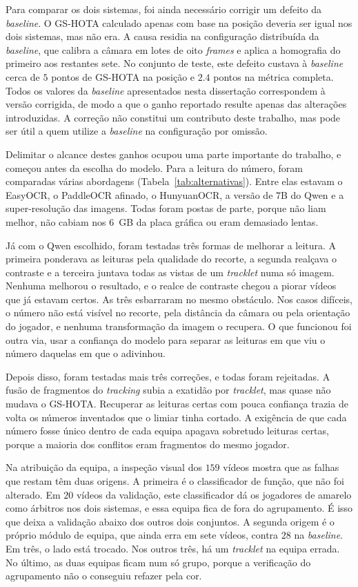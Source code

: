 Para comparar os dois sistemas, foi ainda necessário corrigir um defeito da \emph{baseline}. O GS-HOTA calculado apenas com base na posição deveria ser igual nos dois sistemas, mas não era. A causa residia na configuração distribuída da \emph{baseline}, que calibra a câmara em lotes de oito \emph{frames} e aplica a homografia do primeiro aos restantes sete. No conjunto de teste, este defeito custava à \emph{baseline} cerca de $5$ pontos de GS-HOTA na posição e $2.4$ pontos na métrica completa. Todos os valores da \emph{baseline} apresentados nesta dissertação correspondem à versão corrigida, de modo a que o ganho reportado resulte apenas das alterações introduzidas. A correção não constitui um contributo deste trabalho, mas pode ser útil a quem utilize a \emph{baseline} na configuração por omissão.

Delimitar o alcance destes ganhos ocupou uma parte importante do trabalho, e começou antes da escolha do modelo. Para a leitura do número, foram comparadas várias abordagens (Tabela~\ref{tab:alternativas}). Entre elas estavam o EasyOCR, o PaddleOCR afinado, o HunyuanOCR, a versão de 7B do Qwen e a super-resolução das imagens. Todas foram postas de parte, porque não liam melhor, não cabiam nos 6~GB da placa gráfica ou eram demasiado lentas.

Já com o Qwen escolhido, foram testadas três formas de melhorar a leitura. A primeira ponderava as leituras pela qualidade do recorte, a segunda realçava o contraste e a terceira juntava todas as vistas de um \emph{tracklet} numa só imagem. Nenhuma melhorou o resultado, e o realce de contraste chegou a piorar vídeos que já estavam certos. As três esbarraram no mesmo obstáculo. Nos casos difíceis, o número não está visível no recorte, pela distância da câmara ou pela orientação do jogador, e nenhuma transformação da imagem o recupera. O que funcionou foi outra via, usar a confiança do modelo para separar as leituras em que viu o número daquelas em que o adivinhou.

Depois disso, foram testadas mais três correções, e todas foram rejeitadas. A fusão de fragmentos do \emph{tracking} subia a exatidão por \emph{tracklet}, mas quase não mudava o GS-HOTA. Recuperar as leituras certas com pouca confiança trazia de volta os números inventados que o limiar tinha cortado. A exigência de que cada número fosse único dentro de cada equipa apagava sobretudo leituras certas, porque a maioria dos conflitos eram fragmentos do mesmo jogador.

Na atribuição da equipa, a inspeção visual dos $159$ vídeos mostra que as falhas que restam têm duas origens. A primeira é o classificador de função, que não foi alterado. Em $20$ vídeos da validação, este classificador dá os jogadores de amarelo como árbitros nos dois sistemas, e essa equipa fica de fora do agrupamento. É isso que deixa a validação abaixo dos outros dois conjuntos. A segunda origem é o próprio módulo de equipa, que ainda erra em sete vídeos, contra $28$ na \emph{baseline}. Em três, o lado está trocado. Nos outros três, há um \emph{tracklet} na equipa errada. No último, as duas equipas ficam num só grupo, porque a verificação do agrupamento não o conseguiu refazer pela cor.

